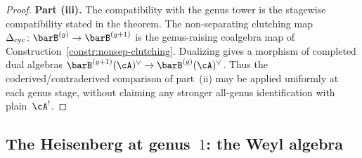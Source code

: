 \begin{proof}
\smallskip\noindent
\textbf{Part (iii).} The compatibility with the genus tower
is the stagewise compatibility stated in the theorem. The
non-separating clutching map
$\Delta_{\mathrm{cyc}}\colon \barB^{(g)} \to \barB^{(g+1)}$
is the genus-raising coalgebra map of
Construction~\ref{constr:nonsep-clutching}. Dualizing gives a
morphism of completed dual algebras
$\barB^{(g+1)}(\cA)^\vee \to \barB^{(g)}(\cA)^\vee$. Thus the
coderived/contraderived comparison of part~(ii) may be applied
uniformly at each genus stage, without claiming any stronger
all-genus identification with plain~$\cA^!$.
\end{proof}

\subsection{The Heisenberg at genus~$1$: the Weyl algebra}
\label{subsec:heisenberg-weyl}

